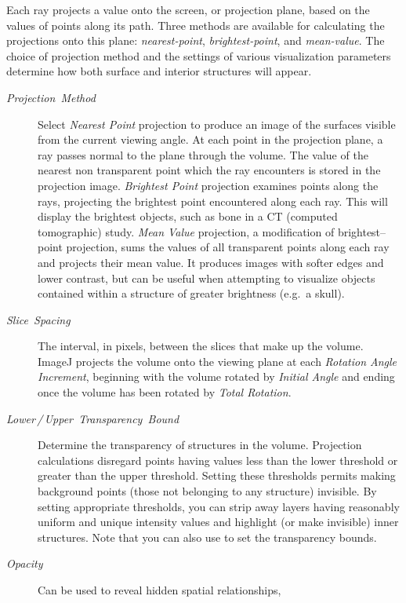 Each ray projects a value onto the screen, or projection
plane, based on the values of points along its path. Three methods
are available for calculating the projections onto this plane: \emph{nearest-point},
\emph{brightest-point}, and \emph{mean-value}. The choice of projection
method and the settings of various visualization parameters determine
how both surface and interior structures will appear.
\begin{description}
\item [{\emph{Projection\ Method}}] Select \emph{Nearest Point }projection
to produce an image of the surfaces visible from the current viewing
angle. At each point in the projection plane, a ray passes normal
to the plane through the volume. The value of the nearest non transparent
point which the ray encounters is stored in the projection image.
\emph{Brightest Point} projection examines points along the rays,
projecting the brightest point encountered along each ray. This will
display the brightest objects, such as bone in a CT
(computed tomographic) study. \emph{Mean Value} projection, a modification
of brightest--point projection, sums the values of all transparent
points along each ray and projects their mean value. It produces images
with softer edges and lower contrast, but can be useful when attempting
to visualize objects contained within a structure of greater brightness
(e.g.\ a skull).
\item [{\emph{Slice\ Spacing}}] The interval, in pixels, between the slices
that make up the volume. ImageJ projects the volume onto the viewing
plane at each \emph{Rotation Angle Increment}, beginning with the
volume rotated by \emph{Initial Angle} and ending once the volume
has been rotated by \emph{Total Rotation}.
\item [{\emph{Lower\,/\,Upper\ Transparency\ Bound}}] Determine the
transparency of structures in the volume. Projection calculations
disregard points having values less than the lower threshold or greater
than the upper threshold. Setting these thresholds permits making
background points (those not belonging to any structure) invisible.
By setting appropriate thresholds, you can strip away layers having
reasonably uniform and unique intensity values and highlight (or make
invisible) inner structures. Note that you can also use 
to set the transparency bounds.
\item [{\emph{Opacity}}] Can be used to reveal hidden spatial relationships,

\end{description}

